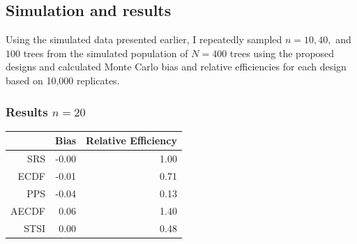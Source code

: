 \documentclass{beamer}
\begin{document}
%
%
\begin{frame}
  \section{Simulation and results}
  Using the simulated data presented earlier, I repeatedly sampled $n = 10, 40,$ and $100$ trees from the simulated population of $N = 400$ trees using the proposed designs and calculated Monte Carlo bias and relative efficiencies for each design based on 10,000 replicates. 
\end{frame}
%
\begin{frame}
  \frametitle{Results $n = 20$}
  \begin{table}[ht]
  \centering
  \begin{tabular}{rrr}
    \hline
    & Bias & Relative Efficiency \\ 
    \hline
    SRS & -0.00 & 1.00 \\ 
    ECDF & -0.01 & 0.71 \\ 
    PPS & -0.04 & 0.13 \\ 
    AECDF & 0.06 & 1.40 \\ 
    STSI & 0.00 & 0.48 \\ 
   \hline
  \end{tabular}
  \end{table}
\end{frame}
\end{document}
